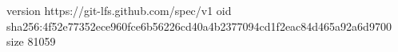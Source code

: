 version https://git-lfs.github.com/spec/v1
oid sha256:4f52e77352ece960fce6b56226cd40a4b2377094cd1f2eac84d465a92a6d9700
size 81059
